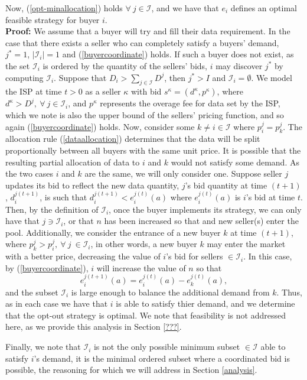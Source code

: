 \documentclass[12pt]{article}
\theoremstyle{definition}
\newcommand{\mcI}{\mathcal{I}}
\begin{document}
\begin{multicols}{2}
{Now, (\ref{opt-minallocation}) holds $\forall \ j\in\mcI$,
and we have that $e_i$ defines an optimal feasible strategy for buyer $i$.
}\\
\textbf{Proof:}
We assume that a buyer will try and fill their data requirement.
In the case that there exists a seller who can completely satisfy a buyers'
demand, $j^*=1$, $\vert \mcI_i\vert =1$ and (\ref{buyercoordinate}) holds. If such a buyer does not exist,
as the set $\mcI_i$ is ordered by the quantity of the sellers' bids, $i$ may discover 
$j^*$ by computing $\mcI_i$.
Suppose that $D_i >
\sum_{j\in\mcI}D^j$, then $j^* > I$ and $\mcI_i = \emptyset$. 
We model the ISP at time $t>0$ as a seller $\kappa$ with bid $s^\kappa =(d^\kappa, p^\kappa)$,
where $d^\kappa > D^j, \
\forall \ j\in\mcI_i$, and
$p^\kappa$ represents the overage fee for data set by the ISP, which we note is also the upper bound of the sellers'
pricing function, and so again (\ref{buyercoordinate}) holds.
Now, consider some $k \ne i \in \mcI$ where $p_i^j = p_k^j$. 
The allocation rule (\ref{dataallocation}) determines that the data will be
split proportionally
between all buyers with the same unit price. 
It is possible that the resulting partial allocation of data to $i$ and $k$
would not satisfy some demand. As the two cases $i$ and $k$ are the same, we
will only consider one. Suppose seller $j$ updates its
bid to reflect the new data quantity, $j$'s bid quantity at time $(t+1)$,
$d_i^{j(t+1)}$, is such that
$d_i^{j(t+1)} < e_i^{j(t)}(a)$ where $e_i^{j(t)}(a)$ is $i$'s bid at time $t$.
Then, by the definition of $\mcI_i$, once the buyer implements its strategy, we can
only have that $j \ni \mcI_i$, or that $n$ has been increased so that and new seller(s)
enter the pool. 
Additionally, we consider the entrance of a new buyer $k$ at time $(t+1)$, where $p_k^j > p_i^j, \ \forall \ j \ \in \mcI_i$, in other
words, a new buyer $k$ may enter the market with a better price, decreasing the
value of $i$'s bid for sellers $\in\mcI_i$. In this case, by (\ref{buyercoordinate}), $i$ will increase the value of
$n$ so that
$$
    e_i^{j(t+1)}(a) = e_i^{j(t)}(a) - e_k^{j(t)}(a),
$$
and the subset $\mcI_i$ is large enough to balance the additional demand from
$k$. Thus, as in each case we have that $i$ is able to satisfy thier demand,
and we determine that the opt-out strategy is optimal. We note that feasibility
is not addressed here, as we provide this analysis in Section \ref{???}.

Finally, we note that $\mcI_i$ is not the only
possible minimum subset $\in\mcI$ able to satisfy $i$'s demand, it is the
minimal ordered subset where a
coordinated bid is possible, the reasoning for which we will address in Section
\ref{analysis}. 


\end{multicols}
\end{document}
